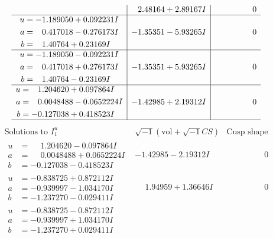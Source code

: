 \documentclass[1p]{elsarticle_modified}
\theoremstyle{definition}
\newcommand{\I}{\sqrt{-1}}
\begin{document}
$$\begin{array}{c|c|c}
 & \phantom{-}2.48164 + 2.89167 I & \phantom{-0.000000 } 0 \\ \hline\begin{aligned}
u &= -1.189050 + 0.092231 I \\
a &= \phantom{-}0.417018 - 0.276173 I \\
b &= \phantom{-}1.40764 + 0.23169 I\end{aligned}
 & -1.35351 - 5.93265 I & \phantom{-0.000000 } 0 \\ \hline\begin{aligned}
u &= -1.189050 - 0.092231 I \\
a &= \phantom{-}0.417018 + 0.276173 I \\
b &= \phantom{-}1.40764 - 0.23169 I\end{aligned}
 & -1.35351 + 5.93265 I & \phantom{-0.000000 } 0 \\ \hline\begin{aligned}
u &= \phantom{-}1.204620 + 0.097864 I \\
a &= \phantom{-}0.0048488 - 0.0652224 I \\
b &= -0.127038 + 0.418523 I\end{aligned}
 & -1.42985 + 2.19312 I & \phantom{-0.000000 } 0\\
 \hline 
 \end{array}$$\newpage$$\begin{array}{c|c|c}  
\text{Solutions to }I^u_{1}& \I (\text{vol} + \sqrt{-1}CS) & \text{Cusp shape}\\
 \hline 
\begin{aligned}
u &= \phantom{-}1.204620 - 0.097864 I \\
a &= \phantom{-}0.0048488 + 0.0652224 I \\
b &= -0.127038 - 0.418523 I\end{aligned}
 & -1.42985 - 2.19312 I & \phantom{-0.000000 } 0 \\ \hline\begin{aligned}
u &= -0.838725 + 0.872112 I \\
a &= -0.939997 - 1.034170 I \\
b &= -1.237270 - 0.029411 I\end{aligned}
 & \phantom{-}1.94959 + 1.36646 I & \phantom{-0.000000 } 0 \\ \hline\begin{aligned}
u &= -0.838725 - 0.872112 I \\
a &= -0.939997 + 1.034170 I \\
b &= -1.237270 + 0.029411 I\end{aligned}

\end{array}$$
\end{document}
